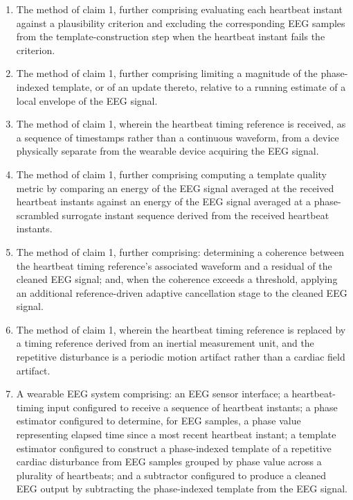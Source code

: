 \documentclass[12pt]{article}
\newcounter{para}
\begin{document}
\begin{enumerate}[label=\arabic*.]
\item The method of claim 1, further comprising evaluating each heartbeat instant against a plausibility criterion and excluding the corresponding EEG samples from the template-construction step when the heartbeat instant fails the criterion.

\item The method of claim 1, further comprising limiting a magnitude of the phase-indexed template, or of an update thereto, relative to a running estimate of a local envelope of the EEG signal.

\item The method of claim 1, wherein the heartbeat timing reference is received, as a sequence of timestamps rather than a continuous waveform, from a device physically separate from the wearable device acquiring the EEG signal.

\item The method of claim 1, further comprising computing a template quality metric by comparing an energy of the EEG signal averaged at the received heartbeat instants against an energy of the EEG signal averaged at a phase-scrambled surrogate instant sequence derived from the received heartbeat instants.

\item The method of claim 1, further comprising: determining a coherence between the heartbeat timing reference's associated waveform and a residual of the cleaned EEG signal; and, when the coherence exceeds a threshold, applying an additional reference-driven adaptive cancellation stage to the cleaned EEG signal.

\item The method of claim 1, wherein the heartbeat timing reference is replaced by a timing reference derived from an inertial measurement unit, and the repetitive disturbance is a periodic motion artifact rather than a cardiac field artifact.

\item A wearable EEG system comprising: an EEG sensor interface; a heartbeat-timing input configured to receive a sequence of heartbeat instants; a phase estimator configured to determine, for EEG samples, a phase value representing elapsed time since a most recent heartbeat instant; a template estimator configured to construct a phase-indexed template of a repetitive cardiac disturbance from EEG samples grouped by phase value across a plurality of heartbeats; and a subtractor configured to produce a cleaned EEG output by subtracting the phase-indexed template from the EEG signal.


\end{enumerate}
\end{document}
